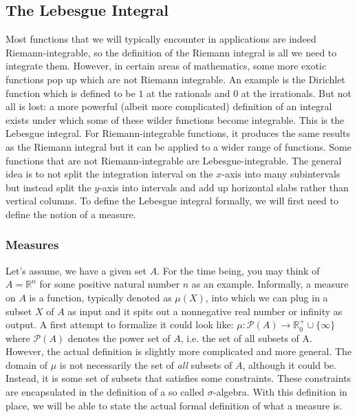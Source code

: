 \subsection{The Lebesgue Integral} 
Most functions that we will typically encounter in applications are indeed Riemann-integrable, so the definition of the Riemann integral is all we need to integrate them. However, in certain areas of mathematics, some more exotic functions pop up which are not Riemann integrable. An example is the Dirichlet function which is defined to be $1$ at the rationals and $0$ at the irrationals. But not all is lost: a more powerful (albeit more complicated) definition of an integral exists under which some of these wilder functions become integrable. This is the Lebesgue integral. For Riemann-integrable functions, it produces the same results as the Riemann integral but it can be applied to a wider range of functions. Some functions that are not Riemann-integrable are Lebesgue-integrable. The general idea is to not split the integration interval on the $x$-axis into many subintervals but instead split the $y$-axis into intervals and add up horizontal slabs rather than vertical columns. To define the Lebesgue integral formally, we will first need to define the notion of a measure.






\subsubsection{Measures}
Let's assume, we have a given set $A$. For the time being, you may think of $A = \mathbb{R}^n$ for some positive natural number $n$ as an example. Informally, a measure on $A$ is a function, typically denoted as $\mu(X)$, into which we can plug in a subset $X$ of $A$ as input and it spits out a nonnegative real number or infinity as output. A first attempt to formalize it could look like: $\mu: \mathcal{P}(A) \rightarrow \mathbb{R}^+_0 \cup \{  \infty \}$ where $\mathcal{P}(A)$ denotes the power set of $A$, i.e. the set of all subsets of A. However, the actual definition is slightly more complicated and more general. The domain of $\mu$ is not necessarily the set of \emph{all} subsets of $A$, although it could be. Instead, it is some set of subsets that satisfies some constraints. These constraints are encapsulated in the definition of a so called $\sigma$-algebra. With this definition in place, we will be able to state the actual formal definition of what a measure is.

